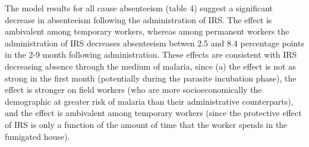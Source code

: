 \documentclass[]{article}
\begin{document}
The model results for all cause absenteeism (table 4) suggest a
significant decrease in absenteeism following the administration of IRS.
The effect is ambivalent among temporary workers, whereas among
permanent workers the administration of IRS decreases absenteeism betwen
2.5 and 8.4 percentage points in the 2-9 month following administration.
These effects are consistent with IRS decreasing absence through the
medium of malaria, since (a) the effect is not as strong in the first
month (potentially during the parasite incubation phase), the effect is
stronger on field workers (who are more socioeconomically the
demographic at greater risk of malaria than their administrative
counterparts), and the effect is ambivalent among temporary workers
(since the protective effect of IRS is only a function of the amount of
time that the worker spends in the fumigated house).
\end{document}

